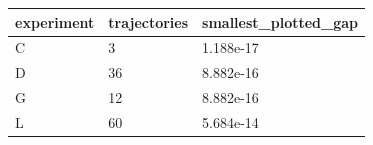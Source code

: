 \begin{tabular}{lll}
\toprule
experiment & trajectories & smallest\_plotted\_gap \\
\midrule
C & 3 & 1.188e-17 \\
D & 36 & 8.882e-16 \\
G & 12 & 8.882e-16 \\
L & 60 & 5.684e-14 \\
\bottomrule
\end{tabular}
